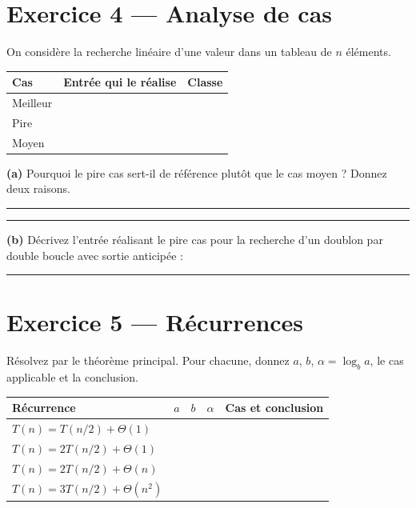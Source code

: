 \documentclass[11pt,a4paper]{article}
\newcommand{\bigTheta}{\Theta}
\newcommand{\lig}[1]{\rule{#1}{0.4pt}}
\begin{document}
\section{Exercice 4 --- Analyse de cas}

On considère la recherche linéaire d'une valeur dans un tableau de $n$
éléments.

\vspace{0.3cm}
\begin{center}
\begin{tabular}{lll}
\toprule
\textbf{Cas} & \textbf{Entrée qui le réalise} & \textbf{Classe} \\
\midrule
Meilleur & \rule{0pt}{0.8cm} & \\
Pire     & \rule{0pt}{0.8cm} & \\
Moyen    & \rule{0pt}{0.8cm} & \\
\bottomrule
\end{tabular}
\end{center}

\vspace{0.3cm}
\noindent\textbf{(a)} Pourquoi le pire cas sert-il de référence plutôt que
le cas moyen ? Donnez deux raisons. \lig{9cm}

\vspace{0.2cm}
\noindent\lig{14cm}

\vspace{0.3cm}
\noindent\textbf{(b)} Décrivez l'entrée réalisant le pire cas pour la
recherche d'un doublon par double boucle avec sortie anticipée :
\lig{8cm}

\section{Exercice 5 --- Récurrences}

Résolvez par le théorème principal. Pour chacune, donnez $a$, $b$,
$\alpha = \log_b a$, le cas applicable et la conclusion.

\vspace{0.3cm}
\begin{center}
\begin{tabular}{lcccc}
\toprule
\textbf{Récurrence} & $a$ & $b$ & $\alpha$ & \textbf{Cas et conclusion} \\
\midrule
$T(n) = T(n/2) + \bigTheta(1)$      & \rule{0pt}{0.8cm} & & & \\
$T(n) = 2T(n/2) + \bigTheta(1)$     & \rule{0pt}{0.8cm} & & & \\
$T(n) = 2T(n/2) + \bigTheta(n)$     & \rule{0pt}{0.8cm} & & & \\
$T(n) = 3T(n/2) + \bigTheta(n^2)$   & \rule{0pt}{0.8cm} & & & \\
\bottomrule
\end{tabular}
\end{center}
\end{document}
